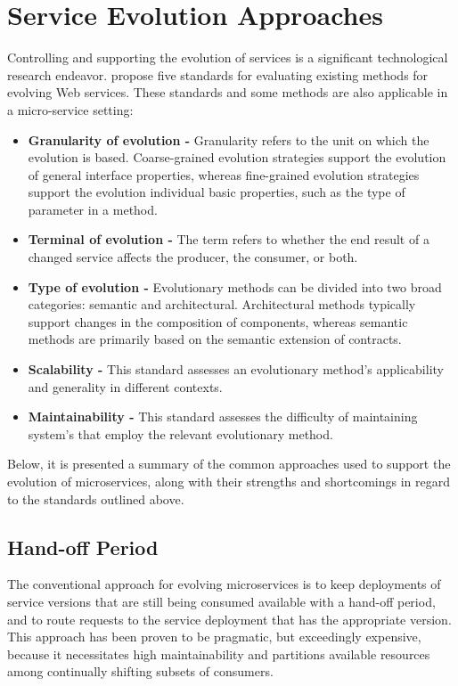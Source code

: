 \section{Service Evolution Approaches} %
\label{sec:service_evolution_approaches}

Controlling and supporting the evolution of services is a significant technological research endeavor.
\citeauthor{webServiceEvolution} \cite{webServiceEvolution} propose five standards for evaluating existing methods for evolving Web services.
These standards and some methods are also applicable in a micro-service setting:

\begin{itemize}
    \item \textbf{Granularity of evolution -} Granularity refers to the unit on which the evolution is based.
    Coarse-grained evolution strategies support the evolution of general interface properties,
    whereas fine-grained evolution strategies support the evolution individual basic properties, such as the type of parameter in a method.
    \item \textbf{Terminal of evolution -} The term refers to whether the end result of a changed service affects the producer, the consumer, or both.
    \item \textbf{Type of evolution -} Evolutionary methods can be divided into two broad categories: semantic and architectural.
    Architectural methods typically support changes in the composition of components, whereas semantic methods are primarily based on the semantic extension of contracts.
    \item \textbf{Scalability -} This standard assesses an evolutionary method's applicability and generality in different contexts.
    \item \textbf{Maintainability -} This standard assesses the difficulty of maintaining system's that employ the relevant evolutionary method.
\end{itemize}

Below, it is presented a summary of the common approaches used to support the evolution of microservices,
along with their strengths and shortcomings in regard to the standards outlined above.

\subsection{Hand-off Period} %
\label{sec:hand_off_period}

The conventional approach for evolving microservices is to keep deployments of service versions that are still being consumed available with a hand-off period,
and to route requests to the service deployment that has the appropriate version.
This approach has been proven to be pragmatic, but exceedingly expensive,
because it necessitates high maintainability and partitions available resources among continually shifting subsets of consumers.

